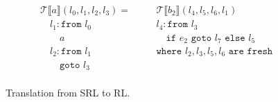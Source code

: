 \begin{figure}[H]
$$\begin{aligned}
    & \mathcal{T}\llbracket a\rrbracket(l_0,l_1,l_2,l_3) =       & & \quad \mathcal{T}\llbracket b_2\rrbracket(l_4,l_5,l_6,l_1)\\
    & \quad l_1: \texttt{from }l_0                                 & & \quad l_4: \texttt{from }l_3\\
    & \quad \quad a                                              & & \quad \quad \texttt{if }e_2\texttt{ goto }l_7\texttt{ else }l_5\\
    & \quad l_2: \texttt{from } l_1                                & & \quad \texttt{where $l_2,l_3,l_5,l_6$ are fresh}\\
    & \quad \quad \texttt{goto } l_3\\
  \end{aligned}$$
  \caption{Translation from SRL to RL.}
  \label{fig:translation_srl_to_rl}
\end{figure}

